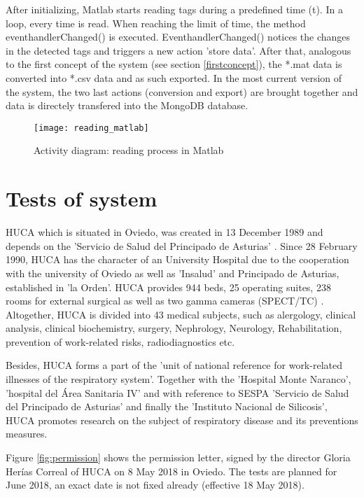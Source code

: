 After initializing, Matlab starts reading tags during a predefined time (t). In a loop, every time is read. When reaching the limit of time, the method eventhandlerChanged() is executed. EventhandlerChanged() notices the changes in the detected tags and triggers a new action 'store data'. After that, analogous to the first concept of the system (see section \ref{firstconcept}), the *.mat data is converted into *.csv data and as such exported. In the most current version of the system, the two last actions (conversion and export) are brought together and data is directely transfered into the MongoDB database. 

\begin{figure}
\centering
\texttt{[image: reading\_matlab]} 
\caption{\label{fig:reading_matlab}Activity diagram: reading process in Matlab} 
\end{figure}

\section{Tests of system}\label{tests}

\ac{HUCA} which is situated in Oviedo, was created in 13 December 1989 and depends on the 'Servicio de Salud del Principado de Asturias' \cite{huca}. Since 28 February 1990, HUCA has the character of an University Hospital due to the cooperation with the university of Oviedo as well as 'Insalud' and Principado de Asturias, established in 'la Orden'. 
HUCA provides 944 beds, 25 operating suites, 238 rooms for external surgical as well as two gamma cameras (\ac{SPECT}/\ac{TC}) \cite{huca}. Altogether, HUCA is divided into 43 medical subjects, such as alergology, clinical analysis, clinical biochemistry, surgery, Nephrology, Neurology, Rehabilitation, prevention of work-related risks, radiodiagnostics etc. 

Besides, HUCA forms a part of the 'unit of national reference for work-related illnesses of the respiratory system'. Together with the 'Hospital Monte Naranco', 'hospital del Área Sanitaria IV' and with reference to \ac{SESPA} 'Servicio de Salud del Principado de Asturias' and finally the 'Instituto Nacional de Silicosis', HUCA promotes research on the subject of respiratory disease and its preventions measures.

Figure \ref{fig:permission} shows the permission letter, signed by the director Gloria Herías Correal of HUCA on 8 May 2018 in Oviedo.
The tests are planned for June 2018, an exact date is not fixed already (effective 18 May 2018). 

